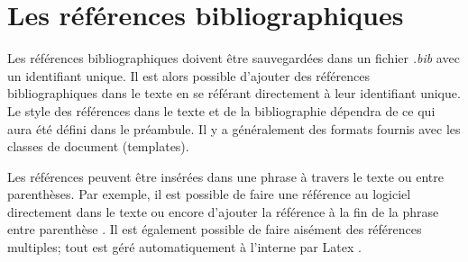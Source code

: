 \documentclass[../exemple_master.tex]{subfiles}
\begin{document}
\section{Les références bibliographiques}

Les références bibliographiques doivent être sauvegardées dans un fichier \emph{.bib} avec un identifiant unique. Il est alors possible d'ajouter des références bibliographiques dans le texte en se référant directement à leur identifiant unique. Le style des références dans le texte et de la bibliographie dépendra de ce qui aura été défini dans le préambule. Il y a généralement des formats fournis avec les classes de document (templates).

Les références peuvent être insérées dans une phrase à travers le texte ou entre parenthèses. Par exemple, il est possible de faire une référence au logiciel \cite{WHAT2016} directement dans le texte ou encore d'ajouter la référence à la fin de la phrase entre parenthèse \citep{WHAT2016}. Il est également possible de faire aisément des références multiples; tout est géré automatiquement à l'interne par Latex \citep{WHAT2016,ladeveze2016}.
\end{document}

